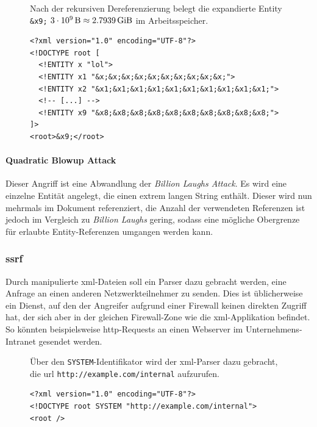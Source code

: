 \begin{figure}[h!]
\begin{example} Nach der rekursiven Dereferenzierung belegt die expandierte Entity \texttt{&x9;} $\SI[parse-numbers=false]{3 \cdot 10^9}{\byte}\approx \SI{2.7939}{\gibi\byte}$ im Arbeitsspeicher.
    \begin{verbatim}
<?xml version="1.0" encoding="UTF-8"?>
<!DOCTYPE root [
  <!ENTITY x "lol">
  <!ENTITY x1 "&x;&x;&x;&x;&x;&x;&x;&x;&x;&x;">
  <!ENTITY x2 "&x1;&x1;&x1;&x1;&x1;&x1;&x1;&x1;&x1;&x1;">
  <!-- [...] -->
  <!ENTITY x9 "&x8;&x8;&x8;&x8;&x8;&x8;&x8;&x8;&x8;&x8;">
]>
<root>&x9;</root>
    \end{verbatim}
\end{example}
\end{figure}

\paragraph{Quadratic Blowup Attack}
Dieser Angriff ist eine Abwandlung der \emph{Billion Laughs Attack}. Es wird eine einzelne Entität angelegt, die einen extrem langen String enthält. Dieser wird nun mehrmals im Dokument referenziert, die Anzahl der verwendeten Referenzen ist jedoch im Vergleich zu \emph{Billion Laughs} gering, sodass eine mögliche Obergrenze für erlaubte Entity-Referenzen umgangen werden kann.

\subsubsection{\acrlong{ssrf}}
\label{sec:xmlattacks-ssrf}

Durch manipulierte \acrshort{xml}-Dateien soll ein Parser dazu gebracht werden, eine Anfrage an einen anderen Netzwerkteilnehmer zu senden. Dies ist üblicherweise ein Dienst, auf den der Angreifer aufgrund einer Firewall keinen direkten Zugriff hat, der sich aber in der gleichen Firewall-Zone wie die \acrshort{xml}-Applikation befindet. So könnten beispielsweise \acrshort{http}-Requests an einen Webserver im Unternehmens-Intranet gesendet werden.

\begin{figure}[h]
    \begin{example} Über den \texttt{SYSTEM}-Identifikator wird der \acrshort{xml}-Parser dazu gebracht, die \acrshort{url} \texttt{http://example.com/internal} aufzurufen.
        \begin{verbatim}
<?xml version="1.0" encoding="UTF-8"?>
<!DOCTYPE root SYSTEM "http://example.com/internal">
<root />
        \end{verbatim}
    \end{example}
\end{figure}

